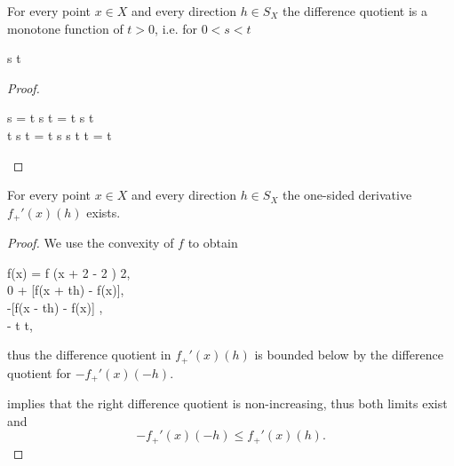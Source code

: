 \begin{lemma}\label{thm:convex_difference_quotient_grows}
  For every point \( x \in X \) and every direction \( h \in S_X \) the difference quotient is a monotone function of \( t > 0 \), i.e. for \( 0 < s < t \)
  \begin{balign*}
     s
    \leq
     t
  \end{balign*}
\end{lemma}
\begin{proof}
  \begin{balign*}
     s
    =
    \frac t s  t
    =
    \frac t s  t
    \leq \\ \leq
    \frac t s  t
    =
    \frac t s \frac s t  t
    =
     t
  \end{balign*}
\end{proof}

\begin{proposition}\label{thm:convex_one_sided_derivatives_exist}
  For every point \( x \in X \) and every direction \( h \in S_X \) the one-sided derivative \( f_+'(x)(h) \) exists.
\end{proposition}
\begin{proof}
  We use the convexity of \( f \) to obtain
  \begin{balign*}
    f(x) = f \left(x +  2 -  2 \right) \leq {} 2,
    \\
    0 \leq [f(x - th) - f(x)] + [f(x + th) - f(x)],
    \\
    -[f(x - th) - f(x)] \leq [f(x + th) - f(x)],
    \\
    - t \leq {} t,
  \end{balign*}
  thus the difference quotient in \( f_+'(x)(h) \) is bounded below by the difference quotient for \( -f_+'(x)(-h) \).

   implies that the right difference quotient is non-increasing, thus both limits exist and
  \begin{equation*}
    -f_+'(x)(-h) \leq f_+'(x)(h).
  \end{equation*}
\end{proof}

